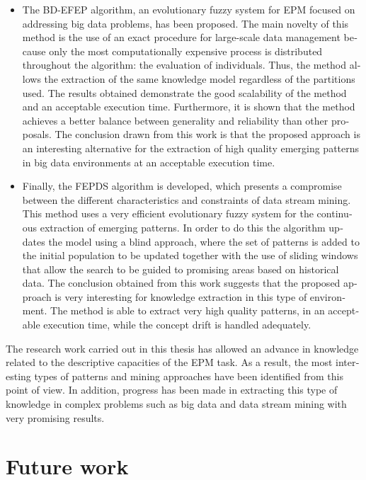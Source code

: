 \documentclass[c5paper,10pt,twoside]{book}	   	%
\begin{document}
\begin{otherlanguage}{british}
\begin{itemize}
	\item The BD-EFEP algorithm, an evolutionary fuzzy system for \ac{EPM} focused on addressing big data problems, has been proposed. The main novelty of this method is the use of an exact procedure for large-scale data management because only the most computationally expensive process is distributed throughout the algorithm: the evaluation of individuals. Thus, the method allows the extraction of the same knowledge model regardless of the partitions used. The results obtained demonstrate the good scalability of the method and an acceptable execution time. Furthermore, it is shown that the method achieves a better balance between generality and reliability than other proposals. The conclusion drawn from this work is that the proposed approach is an interesting alternative for the extraction of high quality emerging patterns in big data environments at an acceptable execution time. 
	
	\item Finally, the FEPDS algorithm is developed, which presents a compromise between the different characteristics and constraints of data stream mining. This method uses a very efficient evolutionary fuzzy system for the continuous extraction of emerging patterns. In order to do this the algorithm updates the model using a blind approach, where the set of patterns is added to the initial population to be updated together with the use of sliding windows that allow the search to be guided to promising areas based on historical data. The conclusion obtained from this work suggests that the proposed approach is very interesting for knowledge extraction in this type of environment. The method is able to extract very high quality patterns, in an acceptable execution time, while the concept drift is handled adequately.
\end{itemize}

The research work carried out in this thesis has allowed an advance in knowledge related to the descriptive capacities of the \ac{EPM} task. As a result, the most interesting types of patterns and mining approaches have been identified from this point of view. In addition, progress has been made in extracting this type of knowledge in complex problems such as big data and data stream mining with very promising results. 







\section{Future work}


\end{otherlanguage}
\end{document}
